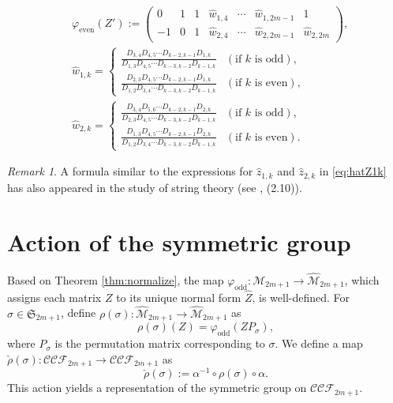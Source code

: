 \documentclass[11pt]{amsart}
\theoremstyle{plain}
\theoremstyle{definition}
\theoremstyle{remark}
\newtheorem{remark}[proposition]{Remark}
\begin{document}
\begin{equation}
\begin{aligned}
&\varphi_{\text{even}}(Z'):=\begin{pmatrix}
0 & 1 & 1 & \widehat{w}_{1,4} & \cdots & \widehat{w}_{1,2m-1} & 1 \ \\[0pt]
-1 & 0 & 1 & \widehat{w}_{2,4} & \cdots &  \widehat{w}_{2,2m-1} & \widehat{w}_{2,2m}
\end{pmatrix},
 \\[15pt]
&\widehat{w}_{1,k} =
\begin{cases}
 \displaystyle\frac{D_{3,4} D_{4,5} \cdots D_{k-2,k-1} D_{1,k}}{D_{1,3} D_{4,5} \cdots D_{k-3,k-2} D_{k-1,k}} & (\text{if } k \text{ is odd}),  \\[15pt]
\displaystyle\frac{D_{2,3} D_{4,5} \cdots D_{k-2,k-1} D_{1,k}}{D_{1,2} D_{3,4} \cdots D_{k-3, k-2}D_{k-1,k}} & (\text{if } k \text{ is even}),
\end{cases} \\[15pt]
&\widehat{w}_{2,k} =
\begin{cases}
\displaystyle\frac{D_{3,4} D_{5,6} \cdots D_{k-2,k-1} D_{2,k}}{D_{2,3} D_{4,5} \cdots D_{k-3, k-2}D_{k-1,k}} & (\text{if } k \text{ is odd}),  \\[15pt]
\displaystyle\frac{D_{1,3} D_{4,5} \cdots D_{k-2,k-1} D_{2,k}}{D_{1,2} D_{3,4} \cdots D_{k-3,k-2}D_{k-1,k}} & (\text{if } k \text{ is even}).
\end{cases}
\end{aligned}
\end{equation}

\begin{remark}
    A formula similar to the expressions for $\widehat{z}_{1,k}$ and $\widehat{z}_{2,k}$ in
    \eqref{eq:hatZ1k} has also appeared in the study of string theory (see
    \cite{HIS2012}, (2.10)).
\end{remark}

\section{Action of the symmetric group}
Based on Theorem \ref{thm:normalize}, the map $\varphi_{\text{odd}} : \mathcal{M}_{2m+1} \to \widehat{\mathcal{M}}_{2m+1}$, which assigns each
matrix $Z$ to its unique normal form $\widehat{Z}$, is well-defined.
For $\sigma\in \mathfrak{S}_{2m+1}$, define $\rho({\sigma}): \widehat{\mathcal{M}}_{2m+1} \to \widehat{\mathcal{M}}_{2m+1}$ as
\begin{equation}
    \rho(\sigma)(Z) = \varphi_{\text{odd}}(Z P_{\sigma}), \label{eq:action}
\end{equation}
where $P_{\sigma}$ is the permutation matrix corresponding to $\sigma$.
We define a map $\check{\rho}(\sigma): \mathcal{CCF}_{2m+1} \rightarrow \mathcal{CCF}_{2m+1}$ as
\begin{equation}
\check{\rho}(\sigma) := \alpha^{-1} \circ \rho(\sigma) \circ \alpha.
\end{equation}
This action yields a representation of the symmetric group on $\mathcal{CCF}_{2m+1}$.
\end{document}
